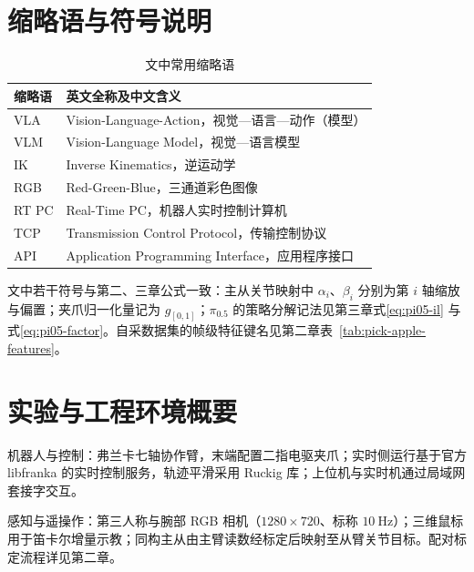 
\begin{appendices}

\section{缩略语与符号说明}

\begin{table}[htbp]
  \centering
  \small
  \caption{文中常用缩略语}
  \label{tab:appendix-abbr}
  \begin{tabular}{ll}
    \toprule
    缩略语 & 英文全称及中文含义 \\
    \midrule
    VLA & Vision-Language-Action，视觉—语言—动作（模型） \\
    VLM & Vision-Language Model，视觉—语言模型 \\
    IK & Inverse Kinematics，逆运动学 \\
    RGB & Red-Green-Blue，三通道彩色图像 \\
    RT PC & Real-Time PC，机器人实时控制计算机 \\
    TCP & Transmission Control Protocol，传输控制协议 \\
    API & Application Programming Interface，应用程序接口 \\
    \bottomrule
  \end{tabular}
\end{table}

文中若干符号与第二、三章公式一致：主从关节映射中 $\alpha_i$、$\beta_i$ 分别为第 $i$ 轴缩放与偏置；夹爪归一化量记为 $g_{[0,1]}$；$\pi_{0.5}$ 的策略分解记法见第三章式\eqref{eq:pi05-il} 与式\eqref{eq:pi05-factor}。自采数据集的帧级特征键名见第二章表~\ref{tab:pick-apple-features}。

\section{实验与工程环境概要}

机器人与控制：弗兰卡七轴协作臂，末端配置二指电驱夹爪；实时侧运行基于官方 libfranka 的实时控制服务，轨迹平滑采用 Ruckig 库；上位机与实时机通过局域网套接字交互。

感知与遥操作：第三人称与腕部 RGB 相机（$1280\times720$、标称 $10~\mathrm{Hz}$）；三维鼠标用于笛卡尔增量示教；同构主从由主臂读数经标定后映射至从臂关节目标。配对标定流程详见第二章。


\end{appendices}

